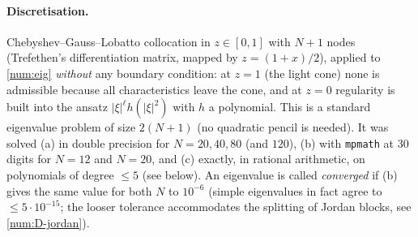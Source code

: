 \paragraph{Discretisation.}
Chebyshev--Gauss--Lobatto collocation in $z\in[0,1]$ with $N+1$ nodes
(Trefethen's differentiation matrix, mapped by $z=(1+x)/2$), applied to
\eqref{num:eig} \emph{without} any boundary condition: at $z=1$ (the light
cone) none is admissible because all characteristics leave the cone, and at
$z=0$ regularity is built into the ansatz $|\xi|^\ell h(|\xi|^2)$ with $h$ a
polynomial. This is a standard eigenvalue problem of size $2(N+1)$ (no
quadratic pencil is needed). It was solved (a) in double precision for
$N=20,40,80$ (and $120$), (b) with \texttt{mpmath} at $30$ digits for $N=12$ and $N=20$,
and (c) exactly, in rational arithmetic, on polynomials of degree $\le5$ (see
below). An eigenvalue is called \emph{converged} if (b) gives the same value
for both $N$ to $10^{-6}$ (simple eigenvalues in fact agree to
$\le5\cdot10^{-15}$; the looser tolerance accommodates the splitting of
Jordan blocks, see \ref{num:D-jordan}).

